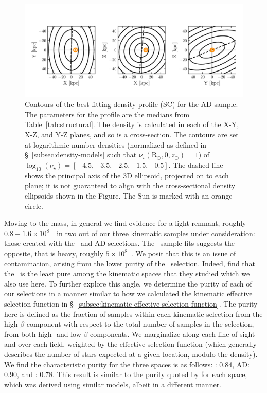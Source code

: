 \begin{figure}
    \centering
    \includegraphics[width=\textwidth]{figure/ch3/contour.pdf}
    \caption{Contours of the best-fitting density profile (SC) for the AD sample. The parameters for the profile are the medians from Table~\ref{tab:structural}. The density is calculated in each of the X-Y, X-Z, and Y-Z planes, and so is a cross-section. The contours are set at logarithmic number densities (normalized as defined in \S~\ref{subsec:density-models} such that $\nu_{\star}(\mathrm{R}_{\odot},0,z_{\odot})=1$) of $\log_{10}(\nu_\mathrm{\star}) = [-4.5,-3.5,-2.5,-1.5,-0.5]$. The dashed line shows the principal axis of the 3D ellipsoid, projected on to each plane; it is not guaranteed to align with the cross-sectional density ellipsoids shown in the Figure. The Sun is marked with an orange circle. }
    \label{fig:pcontour}
\end{figure}

Moving to the mass, in general we find evidence for a light \gse remnant, roughly $0.8-1.6\times 10^{8}$~\Msun\, in two out of our three kinematic samples under consideration: those created with the \eLz\ and AD selections. The \JRLz\ sample fits suggests the opposite, that \gse is heavy, roughly $5\times 10^{8}$~\Msun. We posit that this is an issue of contamination, arising from the lower purity of the \JRLz\ selection. Indeed, \cite{lane22} find that the \JRLz\ is the least pure among the kinematic spaces that they studied which we also use here. To further explore this angle, we determine the purity of each of our selections in a manner similar to how we calculated the kinematic effective selection function in \S~\ref{subsec:kinematic-effective-selection-function}. The purity here is defined as the fraction of samples within each kinematic selection from the high-$\beta$ component with respect to the total number of samples in the selection, from both high- and low-$\beta$ components. We marginalize along each line of sight and over each field, weighted by the effective selection function (which generally describes the number of stars expected at a given location, modulo the density). We find the characteristic purity for the three spaces is as follows: \eLz: 0.84, AD: 0.90, and \JRLz: 0.78. This result is similar to the purity quoted by \cite{lane22} for each space, which was derived using similar models, albeit in a different manner.

